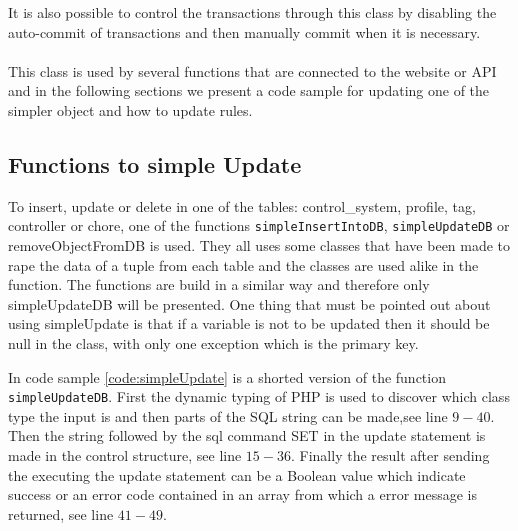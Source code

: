 It is also possible to control the transactions through this class by disabling the auto-commit of transactions and then manually commit when it is necessary. \\\\

This class is used by several functions that are connected to the website or API and in the following sections we present a code sample for updating one of the simpler object and how to update rules. 

\subsection{Functions to simple Update}
To insert, update or delete in one of the tables: control\_system, profile, tag, controller or chore, one of the functions \texttt{simpleInsertIntoDB}, \texttt{simpleUpdateDB} or removeObjectFromDB is used. They all uses some classes that have been made to rape the data of a tuple from each table and the classes are used alike in the function. The functions are build in a similar way and therefore only simpleUpdateDB will be presented. One thing that must be pointed out about using simpleUpdate is that if a variable is not to be updated then it should be null in the class, with only one exception which is the primary key. 

In code sample \ref{code:simpleUpdate} is a shorted version of the function \texttt{simpleUpdateDB}.  
First the dynamic typing of PHP is used to discover which class type the input is and then parts of the SQL string can be made,see line $9-40$. Then the string followed by the sql command SET in the update statement is made in the control structure, see line $15-36$. 
Finally the result after sending the executing the update statement can be a Boolean value which indicate success or an error code contained in an array from which a error message is returned, see line $41-49$.


